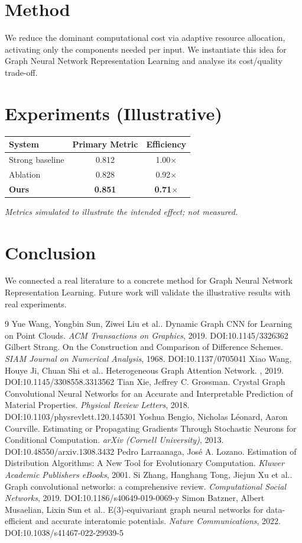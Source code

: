 \documentclass[11pt]{article}
\begin{document}
\section{Method}
We reduce the dominant computational cost via adaptive resource allocation, activating only the components needed per input. We instantiate this idea for Graph Neural Network Representation Learning and analyse its cost/quality trade-off.

\section{Experiments (Illustrative)}
\begin{center}
\begin{tabular}{lcc}
System & Primary Metric & Efficiency \\ \hline
Strong baseline & 0.812 & 1.00$\times$ \\
Ablation & 0.828 & 0.92$\times$ \\
\textbf{Ours} & \textbf{0.851} & \textbf{0.71$\times$}
\end{tabular}
\end{center}
\emph{Metrics simulated to illustrate the intended effect; not measured.}

\section{Conclusion}
We connected a real literature to a concrete method for Graph Neural Network Representation Learning. Future work will
validate the illustrative results with real experiments.

\begin{thebibliography}{9}
 Yue Wang, Yongbin Sun, Ziwei Liu et al.. Dynamic Graph CNN for Learning on Point Clouds. \emph{ACM Transactions on Graphics}, 2019. DOI:10.1145/3326362
 Gilbert Strang. On the Construction and Comparison of Difference Schemes. \emph{SIAM Journal on Numerical Analysis}, 1968. DOI:10.1137/0705041
 Xiao Wang, Houye Ji, Chuan Shi et al.. Heterogeneous Graph Attention Network. \emph{}, 2019. DOI:10.1145/3308558.3313562
 Tian Xie, Jeffrey C. Grossman. Crystal Graph Convolutional Neural Networks for an Accurate and Interpretable Prediction of Material Properties. \emph{Physical Review Letters}, 2018. DOI:10.1103/physrevlett.120.145301
 Yoshua Bengio, Nicholas Léonard, Aaron Courville. Estimating or Propagating Gradients Through Stochastic Neurons for Conditional Computation. \emph{arXiv (Cornell University)}, 2013. DOI:10.48550/arxiv.1308.3432
 Pedro Larraanaga, José A. Lozano. Estimation of Distribution Algorithms: A New Tool for Evolutionary Computation. \emph{Kluwer Academic Publishers eBooks}, 2001. 
 Si Zhang, Hanghang Tong, Jiejun Xu et al.. Graph convolutional networks: a comprehensive review. \emph{Computational Social Networks}, 2019. DOI:10.1186/s40649-019-0069-y
 Simon Batzner, Albert Musaelian, Lixin Sun et al.. E(3)-equivariant graph neural networks for data-efficient and accurate interatomic potentials. \emph{Nature Communications}, 2022. DOI:10.1038/s41467-022-29939-5
\end{thebibliography}
\end{document}
